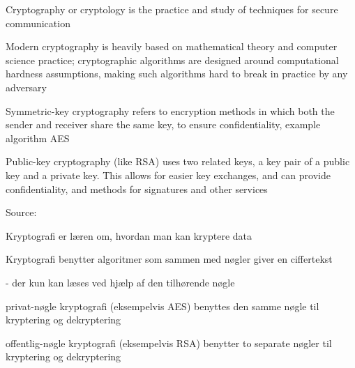 \documentclass[Screen16to9,17pt]{foils}
\begin{document}
\begin{list1}
\item Cryptography or cryptology is the practice and study of techniques for secure communication
\item Modern cryptography is heavily based on mathematical theory and computer science practice; cryptographic algorithms are designed around computational hardness assumptions, making such algorithms hard to break in practice by any adversary
\item Symmetric-key cryptography refers to encryption methods in which both the sender and receiver share the same key, to ensure confidentiality, example algorithm AES
\item Public-key cryptography (like RSA) uses two related keys, a key pair of a public key and a private key. This allows for easier key exchanges, and can provide confidentiality, and methods for signatures and other services
\end{list1}

Source: 





\begin{list1}
\item Kryptografi er læren om, hvordan man kan kryptere data
\item Kryptografi benytter algoritmer som sammen med nøgler giver en
  ciffertekst
\item  - der kun kan læses ved hjælp af den tilhørende nøgle
\end{list1}



\begin{list1}
\item privat-nøgle kryptografi (eksempelvis AES) benyttes den samme
  nøgle til kryptering og dekryptering
\item offentlig-nøgle kryptografi (eksempelvis RSA) benytter to
  separate nøgler til kryptering og dekryptering
\end{list1}


\end{document}
